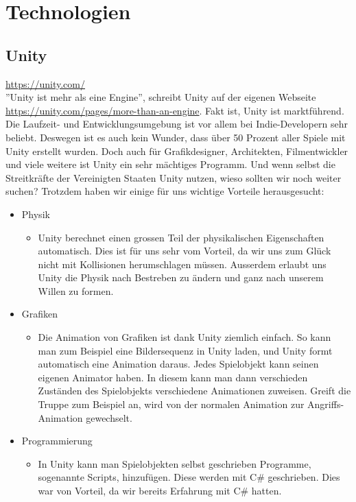 \chapter{Technologien}

\section{Unity}
\url{https://unity.com/}\\
''Unity ist mehr als eine Engine'', schreibt Unity auf der eigenen Webseite \url{https://unity.com/pages/more-than-an-engine}. Fakt ist, Unity ist marktführend. Die Laufzeit- und Entwicklungsumgebung 
ist vor allem bei Indie-Developern sehr beliebt. Deswegen ist es auch kein Wunder, dass über 50 Prozent aller Spiele mit Unity erstellt wurden. 
Doch auch für Grafikdesigner, Architekten, Filmentwickler und viele weitere ist Unity ein sehr mächtiges Programm. Und wenn selbst die Streitkräfte der Vereinigten Staaten Unity nutzen, wieso sollten wir 
noch weiter suchen? Trotzdem haben wir einige für uns wichtige Vorteile herausgesucht:\\

\begin{itemize}
    \item Physik
    \begin{itemize}
        \item Unity berechnet einen grossen Teil der physikalischen Eigenschaften automatisch. Dies ist für uns sehr vom Vorteil, da wir uns zum Glück nicht mit Kollisionen herumschlagen müssen.
        Ausserdem erlaubt uns Unity die Physik nach Bestreben zu ändern und ganz nach unserem Willen zu formen.
    \end{itemize}
    \item Grafiken
    \begin{itemize}
        \item Die Animation von Grafiken ist dank Unity ziemlich einfach. So kann man zum Beispiel eine Bildersequenz in Unity laden, und Unity formt automatisch eine Animation daraus. Jedes Spielobjekt kann seinen
        eigenen Animator haben. In diesem kann man dann verschieden Zuständen des Spielobjekts verschiedene Animationen zuweisen. Greift die Truppe zum Beispiel an, wird von der normalen Animation zur Angriffs-Animation
        gewechselt.  
    \end{itemize}
    \item Programmierung
    \begin{itemize}
        \item In Unity kann man Spielobjekten selbst geschrieben Programme, sogenannte Scripts, hinzufügen. Diese werden mit C\# geschrieben. Dies war von Vorteil, da wir bereits Erfahrung mit C\# hatten. 
    \end{itemize}
\end{itemize}

